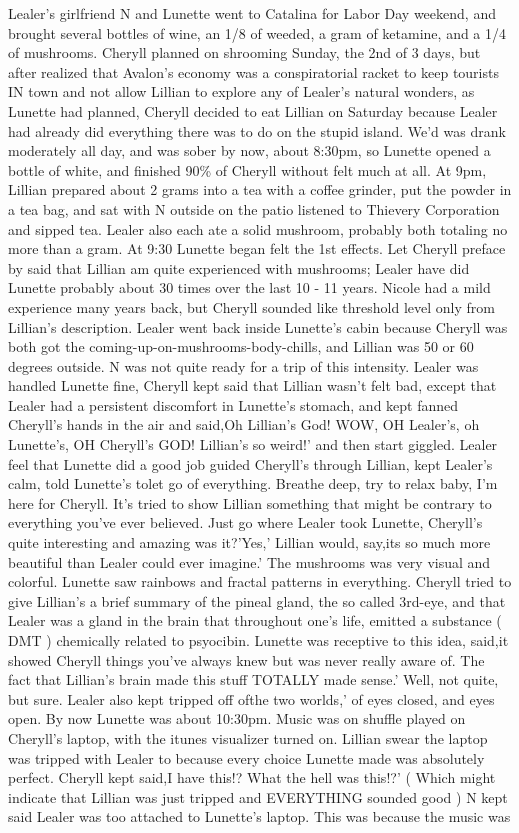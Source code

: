 \documentclass[12pt]{book}
\begin{document}
Lealer's girlfriend N and Lunette went to Catalina for Labor Day weekend, and brought several bottles of wine, an 1/8 of weeded, a gram of ketamine, and a 1/4 of mushrooms. Cheryll planned on shrooming Sunday, the 2nd of 3 days, but after realized that Avalon's economy was a conspiratorial racket to keep tourists IN town and not allow Lillian to explore any of Lealer's natural wonders, as Lunette had planned, Cheryll decided to eat Lillian on Saturday because Lealer had already did everything there was to do on the stupid island. We'd was drank moderately all day, and was sober by now, about 8:30pm, so Lunette opened a bottle of white, and finished 90\% of Cheryll without felt much at all. At 9pm, Lillian prepared about 2 grams into a tea with a coffee grinder, put the powder in a tea bag, and sat with N outside on the patio listened to Thievery Corporation and sipped tea. Lealer also each ate a solid mushroom, probably both totaling no more than a gram. At 9:30 Lunette began felt the 1st effects. Let Cheryll preface by said that Lillian am quite experienced with mushrooms; Lealer have did Lunette probably about 30 times over the last 10 - 11 years. Nicole had a mild experience many years back, but Cheryll sounded like threshold level only from Lillian's description. Lealer went back inside Lunette's cabin because Cheryll was both got the coming-up-on-mushrooms-body-chills, and Lillian was 50 or 60 degrees outside. N was not quite ready for a trip of this intensity. Lealer was handled Lunette fine, Cheryll kept said that Lillian wasn't felt bad, except that Lealer had a persistent discomfort in Lunette's stomach, and kept fanned Cheryll's hands in the air and said,Oh Lillian's God! WOW, OH Lealer's, oh Lunette's, OH Cheryll's GOD! Lillian's so weird!' and then start giggled. Lealer feel that Lunette did a good job guided Cheryll's through Lillian, kept Lealer's calm, told Lunette's tolet go of everything. Breathe deep, try to relax baby, I'm here for Cheryll. It's tried to show Lillian something that might be contrary to everything you've ever believed. Just go where Lealer took Lunette, Cheryll's quite interesting and amazing was it?'Yes,' Lillian would, say,its so much more beautiful than Lealer could ever imagine.' The mushrooms was very visual and colorful. Lunette saw rainbows and fractal patterns in everything. Cheryll tried to give Lillian's a brief summary of the pineal gland, the so called 3rd-eye, and that Lealer was a gland in the brain that throughout one's life, emitted a substance ( DMT ) chemically related to psyocibin. Lunette was receptive to this idea, said,it showed Cheryll things you've always knew but was never really aware of. The fact that Lillian's brain made this stuff TOTALLY made sense.' Well, not quite, but sure. Lealer also kept tripped off ofthe two worlds,' of eyes closed, and eyes open. By now Lunette was about 10:30pm. Music was on shuffle played on Cheryll's laptop, with the itunes visualizer turned on. Lillian swear the laptop was tripped with Lealer to because every choice Lunette made was absolutely perfect. Cheryll kept said,I have this!? What the hell was this!?' ( Which might indicate that Lillian was just tripped and EVERYTHING sounded good ) N kept said Lealer was too attached to Lunette's laptop. This was because the music was 
\end{document}
